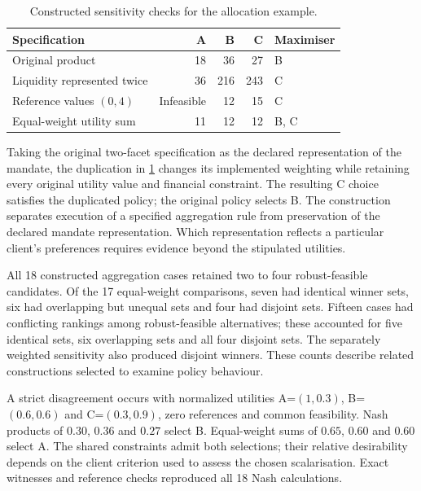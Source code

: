 \documentclass[oneside,10pt,english]{swissi}
\begin{document}
\begin{table}[htbp]
\centering
\caption{Constructed sensitivity checks for the allocation example.}
\label{tab:sensitivity}
\small
\begin{tabularx}{\textwidth}{@{}Xrrrl@{}}
\toprule
Specification & A & B & C & Maximiser \\
\midrule
Original product & 18 & 36 & 27 & B \\
Liquidity represented twice & 36 & 216 & 243 & C \\
Reference values $(0,4)$ & Infeasible & 12 & 15 & C \\
Equal-weight utility sum & 11 & 12 & 12 & B, C \\
\bottomrule
\end{tabularx}
\end{table}

Taking the original two-facet specification as the declared representation of the mandate, the duplication in \cref{tab:sensitivity} changes its implemented weighting while retaining every original utility value and financial constraint. The resulting C choice satisfies the duplicated policy; the original policy selects B. The construction separates execution of a specified aggregation rule from preservation of the declared mandate representation. Which representation reflects a particular client's preferences requires evidence beyond the stipulated utilities.

All 18 constructed aggregation cases retained two to four robust-feasible candidates. Of the 17 equal-weight comparisons, seven had identical winner sets, six had overlapping but unequal sets and four had disjoint sets. Fifteen cases had conflicting rankings among robust-feasible alternatives; these accounted for five identical sets, six overlapping sets and all four disjoint sets. The separately weighted sensitivity also produced disjoint winners. These counts describe related constructions selected to examine policy behaviour.

A strict disagreement occurs with normalized utilities A=$(1,0.3)$, B=$(0.6,0.6)$ and C=$(0.3,0.9)$, zero references and common feasibility. Nash products of $0.30$, $0.36$ and $0.27$ select B. Equal-weight sums of $0.65$, $0.60$ and $0.60$ select A. The shared constraints admit both selections; their relative desirability depends on the client criterion used to assess the chosen scalarisation. Exact witnesses and reference checks reproduced all 18 Nash calculations.
\end{document}
